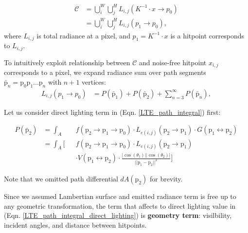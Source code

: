 \begin{align}
    \mathcal{C} & = \bigcup_i^W \bigcup_j^H L_{i,j}\left(K^{-1}\cdot x\rightarrow p_0\right) \nonumber \\
    & = \bigcup_i^W \bigcup_j^H L_{i,j}\left(p_1\rightarrow p_0\right),
\end{align}
where $L_{i,j}$ is total radiance at a pixel, and $p_1=K^{-1}\cdot x$ is a hitpoint corresponds to $L_{i,j}$.

To intuitively exploit relationship between $\mathcal{C}$ and noise-free hitpoint $x_{i,j}$ corresponds to a pixel, we expand radiance sum over path segments $\bar{\mathrm{p}}_n=\mathrm{p}_0\mathrm{p}_1...\mathrm{p}_n$ with $n+1$ vertices:
\begin{align}
    L_{i,j}\left(p_1\rightarrow p_0\right)& = \mathit{P}\left(\bar{\mathrm{p}}_1\right)+\mathit{P}\left(\bar{\mathrm{p}}_2\right)+\sum_{n=3}^\infty \mathit{P}\left(\bar{\mathrm{p}}_n\right), 
    \label{LTE_path_integral}
\end{align}


Let us consider direct lighting term in (Eqn. \ref{LTE_path_integral}) first:

\begin{align}
    \mathit{P}\left(\bar{\mathrm{p}}_2\right) & = \int_A && f\left(\mathrm{p}_2\rightarrow \mathrm{p}_1 \rightarrow \mathrm{p}_0\right)\cdot L_{e(i,j)}\left(\mathrm{p}_2\rightarrow \mathrm{p}_1\right) \cdot G\left(\mathrm{p}_1 \leftrightarrow \mathrm{p}_2\right) \nonumber \\
    & = \int_A \Bigg[ && f\left(\mathrm{p}_2\rightarrow \mathrm{p}_1 \rightarrow \mathrm{p}_0\right)\cdot L_{e(i,j)}(\mathrm{p}_2\rightarrow \mathrm{p}_1) \nonumber \\ 
    & && \cdot V(\mathrm{p}_1 \leftrightarrow \mathrm{p}_2) \cdot \frac{|\cos(\theta_1)| |\cos(\theta_2)|}{||\mathrm{p}_1-\mathrm{p}_2||^2}\Bigg]
    \label{LTE_path_integral_direct_lighting}
\end{align}

Note that we omitted path differential $dA(\mathrm{p}_2)$ for brevity.

Since we assumed Lambertian surface and emitted radiance term is free up to any geometric transformation, the term that affects to direct lighting value in (Eqn. \ref{LTE_path_integral_direct_lighting}) is \textbf{geometry term}: visilbility, incident angles, and distance between hitpoints.

